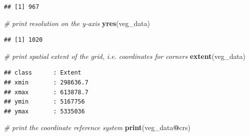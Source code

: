\documentclass[12pt,]{book}
\newenvironment{Shaded}{\begin{snugshade}}{\end{snugshade}}
\newcommand{\CommentTok}[1]{\textcolor[rgb]{0.56,0.35,0.01}{\textit{#1}}}
\newcommand{\KeywordTok}[1]{\textcolor[rgb]{0.13,0.29,0.53}{\textbf{#1}}}
\newcommand{\NormalTok}[1]{#1}
\newcommand{\OperatorTok}[1]{\textcolor[rgb]{0.81,0.36,0.00}{\textbf{#1}}}
\begin{document}
\begin{verbatim}
## [1] 967
\end{verbatim}

\begin{Shaded}
\begin{Highlighting}[]
\CommentTok{# print resolution on the y-axis}
\KeywordTok{yres}\NormalTok{(veg_data)}
\end{Highlighting}
\end{Shaded}

\begin{verbatim}
## [1] 1020
\end{verbatim}

\begin{Shaded}
\begin{Highlighting}[]
\CommentTok{# print spatial extent of the grid, i.e. coordinates for corners}
\KeywordTok{extent}\NormalTok{(veg_data)}
\end{Highlighting}
\end{Shaded}

\begin{verbatim}
## class      : Extent 
## xmin       : 298636.7 
## xmax       : 613878.7 
## ymin       : 5167756 
## ymax       : 5335036
\end{verbatim}

\begin{Shaded}
\begin{Highlighting}[]
\CommentTok{# print the coordinate reference system}
\KeywordTok{print}\NormalTok{(veg_data}\OperatorTok{@}\NormalTok{crs)}
\end{Highlighting}
\end{Shaded}
\end{document}
